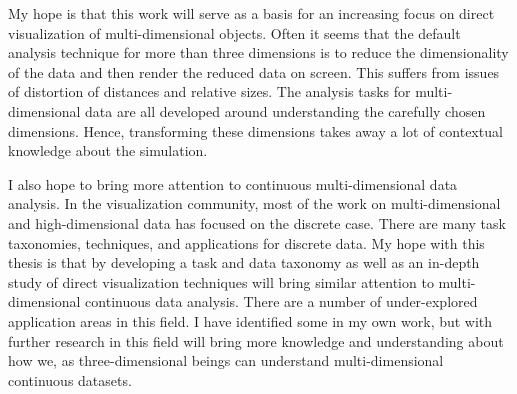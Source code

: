 My hope is that this
work will serve as a basis for an increasing focus on direct visualization of
multi-dimensional objects. Often it seems that the default analysis technique
for more than three dimensions is to reduce
the dimensionality of the
data and then render the reduced data on screen. This suffers from issues of
distortion of distances and relative sizes. The analysis tasks for
multi-dimensional data are all developed around understanding the carefully
chosen dimensions. Hence, transforming these dimensions takes away a lot of
contextual knowledge about the simulation. 

I also hope to bring more attention to continuous multi-dimensional data analysis.
In the visualization community, most of the work on multi-dimensional and high-dimensional
data has focused on the discrete case. There are many task taxonomies, techniques,
and applications for discrete data. My hope with this thesis is that by developing
a task and data taxonomy as well as an in-depth study of direct visualization
techniques will bring similar attention to multi-dimensional continuous data
analysis. There are a number of under-explored application areas in this
field. I have identified some in my own work, but with further research in this
field will bring more knowledge and understanding about how we, as three-dimensional
beings can understand multi-dimensional continuous datasets.





